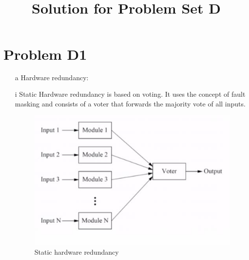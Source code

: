\documentclass[]{article}
\title{Solution for Problem Set D}
\author{}
\begin{document}
	
	\maketitle
	
	\section{Problem D1}
	\begin{itemize}
		\item[a] Hardware redundancy:
		\item[i]Static Hardware redundancy is based on voting. It uses the concept of fault masking and consists of a voter that forwards the majority vote of all inputs.
		\begin{figure}[h]
			\centering
			\includegraphics{Static}  
			\caption{Static hardware redundancy}
		\end{figure}
		

\end{itemize}
\end{document}
